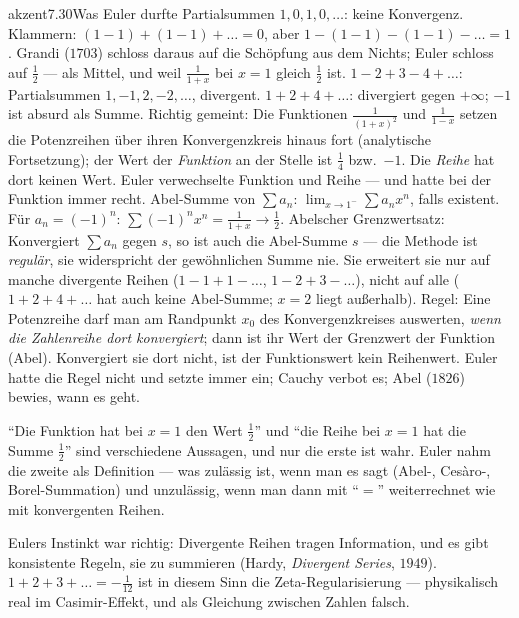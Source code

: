 \begin{loesungkarte}{akzent}{7.30}{Was Euler durfte}
Partialsummen $1, 0, 1, 0, \dots$: keine Konvergenz. Klammern: $(1 - 1) + (1 - 1) + \dots = 0$, aber $1 - (1 - 1) - (1 - 1) - \dots = 1$. Grandi ($1703$) schloss daraus auf die Schöpfung aus dem Nichts; Euler schloss auf $\frac12$ --- als Mittel, und weil $\frac1{1 + x}$ bei $x = 1$ gleich $\frac12$ ist.
$1 - 2 + 3 - 4 + \dots$: Partialsummen $1, -1, 2, -2, \dots$, divergent. $1 + 2 + 4 + \dots$: divergiert gegen $+\infty$; $-1$ ist absurd als Summe. Richtig gemeint: Die Funktionen $\frac1{(1 + x)^{2}}$ und $\frac1{1 - x}$ setzen die Potenzreihen über ihren Konvergenzkreis hinaus fort (analytische Fortsetzung); der Wert der \emph{Funktion} an der Stelle ist $\frac14$ bzw.\ $-1$. Die \emph{Reihe} hat dort keinen Wert. Euler verwechselte Funktion und Reihe --- und hatte bei der Funktion immer recht.
Abel-Summe von $\sum a_n$: $\lim_{x\to1^{-}}\sum a_nx^{n}$, falls existent. Für $a_n = (-1)^{n}$: $\sum(-1)^{n}x^{n} = \frac1{1 + x}\to\frac12$. Abelscher Grenzwertsatz: Konvergiert $\sum a_n$ gegen $s$, so ist auch die Abel-Summe $s$ --- die Methode ist \emph{regulär}, sie widerspricht der gewöhnlichen Summe nie. Sie erweitert sie nur auf manche divergente Reihen ($1 - 1 + 1 - \dots$, $1 - 2 + 3 - \dots$), nicht auf alle ($1 + 2 + 4 + \dots$ hat auch keine Abel-Summe; $x = 2$ liegt außerhalb).
Regel: Eine Potenzreihe darf man am Randpunkt $x_0$ des Konvergenzkreises auswerten, \emph{wenn die Zahlenreihe dort konvergiert}; dann ist ihr Wert der Grenzwert der Funktion (Abel). Konvergiert sie dort nicht, ist der Funktionswert kein Reihenwert. Euler hatte die Regel nicht und setzte immer ein; Cauchy verbot es; Abel ($1826$) bewies, wann es geht.
\begin{fehler}\kastentext
\enquote{Die Funktion hat bei $x = 1$ den Wert $\frac12$} und \enquote{die Reihe bei $x = 1$ hat die Summe $\frac12$} sind verschiedene Aussagen, und nur die erste ist wahr. Euler nahm die zweite als Definition --- was zulässig ist, wenn man es sagt (Abel-, Cesàro-, Borel-Summation) und unzulässig, wenn man dann mit \enquote{$=$} weiterrechnet wie mit konvergenten Reihen.
\end{fehler}
\begin{mitnehmen}\kastentext
Eulers Instinkt war richtig: Divergente Reihen tragen Information, und es gibt konsistente Regeln, sie zu summieren (Hardy, \emph{Divergent Series}, $1949$). $1 + 2 + 3 + \dots = -\frac1{12}$ ist in diesem Sinn die Zeta-Regularisierung --- physikalisch real im Casimir-Effekt, und als Gleichung zwischen Zahlen falsch.
\end{mitnehmen}
\end{loesungkarte}


